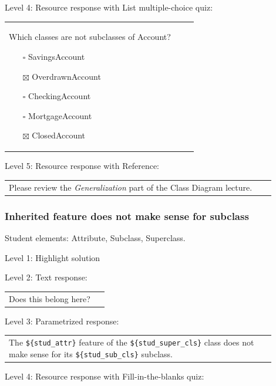 \noindent Level 4: Resource response with List multiple-choice quiz: \medskip

\begin{tabular}{|p{0.9\linewidth}}

Which classes are not subclasses of Account?

\begin{itemize}
    \item[$\square$] SavingsAccount
    \item[$\boxtimes$] OverdrawnAccount
    \item[$\square$] CheckingAccount
    \item[$\square$] MortgageAccount
    \item[$\boxtimes$] ClosedAccount
\end{itemize}

\end{tabular} \medskip

\noindent Level 5: Resource response with Reference: \medskip

\begin{tabular}{|p{0.9\linewidth}}
Please review the \textit{Generalization} part of the Class Diagram lecture.
\end{tabular} \medskip


\subsubsection{Inherited feature does not make sense for subclass}

Student elements: Attribute, Subclass, Superclass.  \medskip

\noindent Level 1: Highlight solution  \medskip

\noindent Level 2: Text response: \medskip

\begin{tabular}{|p{0.9\linewidth}}
Does this belong here?
\end{tabular} \medskip

\noindent Level 3: Parametrized response: \medskip

\begin{tabular}{|p{0.9\linewidth}}
The \verb|${stud_attr}| feature of the \verb|${stud_super_cls}| class does not make sense for its \verb|${stud_sub_cls}| subclass.
\end{tabular} \medskip

\noindent Level 4: Resource response with Fill-in-the-blanks quiz: \medskip

